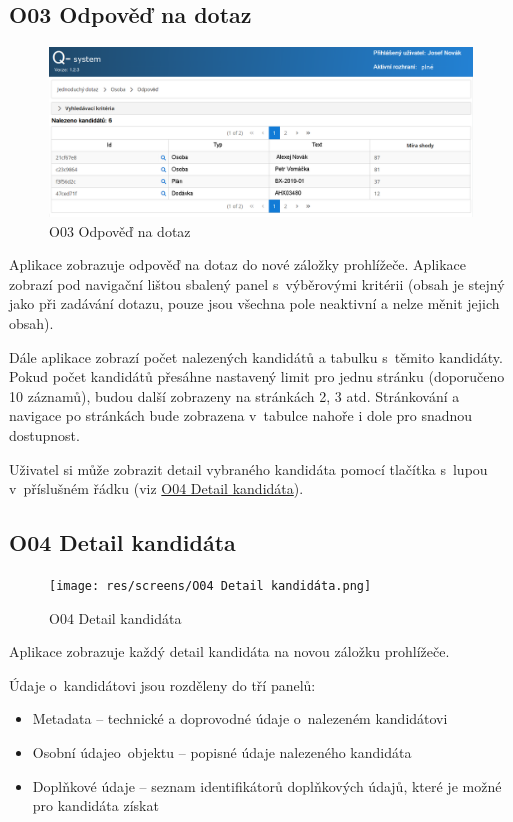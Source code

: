\documentclass[thesis=M,czech]{FITthesis}[2019/12/23]
\begin{document}
\subsection{O03 Odpověď na dotaz}
\label{O03OdpovedNaDotaz}
\begin{figure}[H]
  \centering
  \includegraphics[width=\textwidth]{res/screens/O03 Odpověď na dotaz.png}
  \caption{O03 Odpověď na dotaz}
  \label{fig:O03 Odpověď na dotaz}
\end{figure}

Aplikace zobrazuje odpověď na dotaz do nové záložky prohlížeče. Aplikace zobrazí pod navigační lištou sbalený panel s~výběrovými kritérii (obsah je stejný jako při zadávání dotazu, pouze jsou všechna pole neaktivní a nelze měnit jejich obsah).

Dále aplikace zobrazí počet nalezených kandidátů a tabulku s~těmito kandidáty. Pokud počet kandidátů přesáhne nastavený limit pro jednu stránku (doporučeno 10 záznamů), budou další zobrazeny na stránkách 2, 3 atd. Stránkování a navigace po stránkách bude zobrazena v~tabulce nahoře i dole pro snadnou dostupnost.

Uživatel si může zobrazit detail vybraného kandidáta pomocí tlačítka s~lupou v~příslušném řádku (viz \hyperref[O04DetailKandidata]{O04 Detail kandidáta}).

\subsection{O04 Detail kandidáta}
\label{O04DetailKandidata}
\begin{figure}[H]
  \centering
  \texttt{[image: res/screens/O04 Detail kandidáta.png]}
  \caption{O04 Detail kandidáta}
  \label{fig:O04 Detail kandidáta}
\end{figure}

Aplikace zobrazuje každý detail kandidáta na novou záložku prohlížeče.

Údaje o~kandidátovi jsou rozděleny do tří panelů:
\begin{itemize}
	\item Metadata -- technické a doprovodné údaje o~nalezeném kandidátovi
	\item Osobní údaje o~objektu -- popisné údaje nalezeného kandidáta
	\item Doplňkové údaje -- seznam identifikátorů doplňkových údajů, které je možné pro kandidáta získat
\end{itemize}
\end{document}
